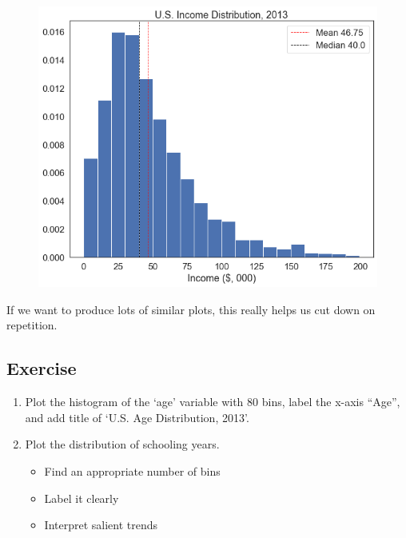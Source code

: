 \documentclass[
  letterpaper,
  DIV=11,
  numbers=noendperiod]{scrreprt}
\newenvironment{Shaded}{\begin{snugshade}}{\end{snugshade}}
\newcommand{\DecValTok}[1]{\textcolor[rgb]{0.68,0.00,0.00}{#1}}
\newcommand{\NormalTok}[1]{\textcolor[rgb]{0.00,0.23,0.31}{#1}}
\newcommand{\OperatorTok}[1]{\textcolor[rgb]{0.37,0.37,0.37}{#1}}
\newcommand{\StringTok}[1]{\textcolor[rgb]{0.13,0.47,0.30}{#1}}
\providecommand{\tightlist}{%
  \setlength{\itemsep}{0pt}\setlength{\parskip}{0pt}}\usepackage{longtable,booktabs,array}
\begin{document}
\begin{Shaded}
\end{Shaded}

\begin{figure}[H]

{\centering \includegraphics{notebooks/W07. Distributions and Basic Statistics_files/figure-pdf/cell-19-output-1.png}

}

\end{figure}

If we want to produce lots of similar plots, this really helps us cut
down on repetition.

\hypertarget{exercise-20}{%
\subsection{Exercise}\label{exercise-20}}

\begin{enumerate}
\def\labelenumi{\arabic{enumi}.}
\tightlist
\item
  Plot the histogram of the `age' variable with 80 bins, label the
  x-axis ``Age'', and add title of `U.S. Age Distribution, 2013'.
\item
  Plot the distribution of schooling years.

  \begin{itemize}
  \tightlist
  \item
    Find an appropriate number of bins
  \item
    Label it clearly
  \item
    Interpret salient trends
  \end{itemize}
\end{enumerate}
\end{document}
